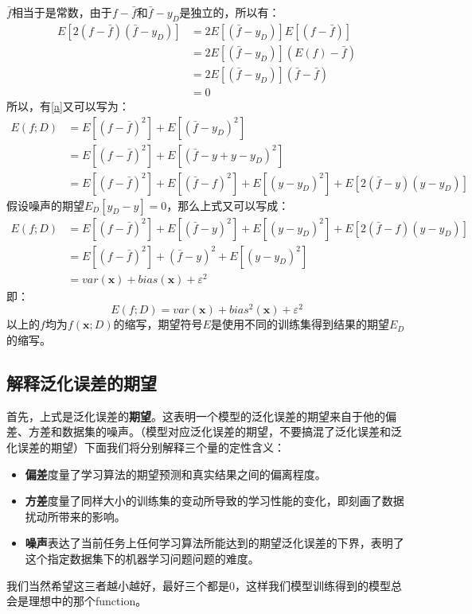 \documentclass[12pt, letterpaper]{article}
\begin{document}
$\bar{f}$相当于是常数，由于$f-\bar{f}$和$\bar{f}-y_D$是独立的，所以有：
$$
\begin{aligned}
E[2(f-\bar{f})(\bar{f}-y_D)]&=2E[(\bar{f}-y_D)]E[(f-\bar{f})]\\
&=2E[(\bar{f}-y_D)](E(f)-\bar{f})\\
&=2E[(\bar{f}-y_D)](\bar{f}-\bar{f})\\
&=0
\end{aligned}
$$
所以，有\ref{a}又可以写为：
$$
\begin{aligned}
E(f;D)&=E[(f-\bar{f})^2]+E[(\bar{f}-y_D)^2]\\
&=E[(f-\bar{f})^2]+E[(\bar{f}-y+y-y_D)^2]\\
&=E[(f-\bar{f})^2]+E[(\bar{f}-f)^2]+E[(y-y_D)^2]+E[2(\bar{f}-y)(y-y_D)]
\end{aligned}
$$
假设噪声的期望$E_D[y_D-y]=0$，那么上式又可以写成：
$$
\begin{aligned}
E(f;D)&=E[(f-\bar{f})^2]+E[(\bar{f}-y)^2]+E[(y-y_D)^2]+E[2(\bar{f}-f)(y-y_D)]\\
&=E[(f-\bar{f})^2]+(\bar{f}-y)^2+E[(y-y_D)^2]\\
&=var(\mathbf{x})+bias(\mathbf{x})+\varepsilon^2
\end{aligned}
$$
即：
\begin{equation}
E(f;D)=var(\mathbf{x})+bias^2(\mathbf{x})+\varepsilon^2
\end{equation}
以上的$f$均为$f(\mathbf{x};D)$的缩写，期望符号$E$是使用不同的训练集得到结果的期望$E_D$的缩写。

\subsection{解释泛化误差的期望}
首先，上式是泛化误差的\textbf{期望}。这表明一个模型的泛化误差的期望来自于他的偏差、方差和数据集的噪声。（模型对应泛化误差的期望，不要搞混了泛化误差和泛化误差的期望）下面我们将分别解释三个量的定性含义：
\begin{itemize}
\item \textbf{偏差}度量了学习算法的期望预测和真实结果之间的偏离程度。
\item\textbf{方差}度量了同样大小的训练集的变动所导致的学习性能的变化，即刻画了数据扰动所带来的影响。
\item \textbf{噪声}表达了当前任务上任何学习算法所能达到的期望泛化误差的下界，表明了这个指定数据集下的机器学习问题问题的难度。
\end{itemize}

我们当然希望这三者越小越好，最好三个都是0，这样我们模型训练得到的模型总会是理想中的那个function。
\end{document}
